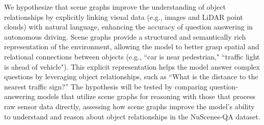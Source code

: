 \documentclass{article} %
\begin{document}
	We hypothesize that scene graphs improve the understanding of object relationships by explicitly linking visual data (e.g., images and LiDAR point clouds) with natural language, enhancing the accuracy of question answering in autonomous driving. Scene graphs provide a structured and semantically rich representation of the environment, allowing the model to better grasp spatial and relational connections between objects (e.g., ``car is near pedestrian," ``traffic light is ahead of vehicle"). This explicit representation helps the model answer complex questions by leveraging object relationships, such as  ``What is the distance to the nearest traffic sign?” The hypothesis will be tested by comparing question-answering models that utilize scene graphs for reasoning with those that process raw sensor data directly, assessing how scene graphs improve the model’s ability to understand and reason about object relationships in the NuScenes-QA dataset.
	
	
	
	
	
\end{document}
